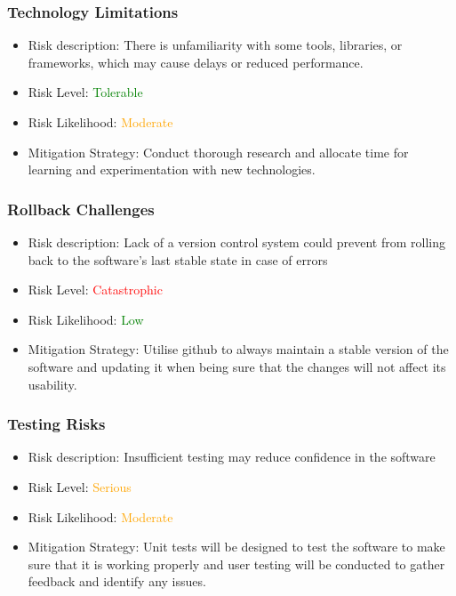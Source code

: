 \documentclass[12pt]{article}
\begin{document}
        \subsubsection{Technology Limitations}
        \begin{itemize}
            \item Risk description: There is unfamiliarity with some tools, libraries, or frameworks, which may cause delays or reduced performance. 
            \item Risk Level: \textcolor{green}{Tolerable}
            \item Risk Likelihood: \textcolor{orange}{Moderate}
            \item Mitigation Strategy: Conduct thorough research and allocate time for learning and experimentation with new technologies.
        \end{itemize}

        \subsubsection{Rollback Challenges}
        \begin{itemize}
            \item Risk description: Lack of a version control system could prevent from rolling back to the software's last stable state in case of errors
            \item Risk Level: \textcolor{red}{Catastrophic}
            \item Risk Likelihood: \textcolor{green}{Low}
            \item Mitigation Strategy: Utilise github to always maintain a stable version of the software and updating it when being sure that the changes will not affect its usability. 
        \end{itemize}

        \subsubsection{Testing Risks}
        \begin{itemize}
            \item Risk description: Insufficient testing may reduce confidence in the software
            \item Risk Level: \textcolor{orange}{Serious}
            \item Risk Likelihood: \textcolor{orange}{Moderate}
            \item Mitigation Strategy: Unit tests will be designed to test the software to make sure that it is working properly and user testing will be conducted to gather feedback and identify any issues.
        \end{itemize}
\end{document}
